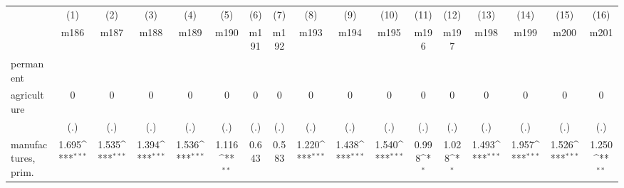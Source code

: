 {
\def\sym#1{\ifmmode^{#1}\else\(^{#1}\)\fi}
\begin{tabular}{l*{16}{c}}
\hline\hline
                    &\multicolumn{1}{c}{(1)}&\multicolumn{1}{c}{(2)}&\multicolumn{1}{c}{(3)}&\multicolumn{1}{c}{(4)}&\multicolumn{1}{c}{(5)}&\multicolumn{1}{c}{(6)}&\multicolumn{1}{c}{(7)}&\multicolumn{1}{c}{(8)}&\multicolumn{1}{c}{(9)}&\multicolumn{1}{c}{(10)}&\multicolumn{1}{c}{(11)}&\multicolumn{1}{c}{(12)}&\multicolumn{1}{c}{(13)}&\multicolumn{1}{c}{(14)}&\multicolumn{1}{c}{(15)}&\multicolumn{1}{c}{(16)}\\
                    &\multicolumn{1}{c}{m186}&\multicolumn{1}{c}{m187}&\multicolumn{1}{c}{m188}&\multicolumn{1}{c}{m189}&\multicolumn{1}{c}{m190}&\multicolumn{1}{c}{m191}&\multicolumn{1}{c}{m192}&\multicolumn{1}{c}{m193}&\multicolumn{1}{c}{m194}&\multicolumn{1}{c}{m195}&\multicolumn{1}{c}{m196}&\multicolumn{1}{c}{m197}&\multicolumn{1}{c}{m198}&\multicolumn{1}{c}{m199}&\multicolumn{1}{c}{m200}&\multicolumn{1}{c}{m201}\\
\hline
permanent           &                     &                     &                     &                     &                     &                     &                     &                     &                     &                     &                     &                     &                     &                     &                     &                     \\
agriculture         &           0         &           0         &           0         &           0         &           0         &           0         &           0         &           0         &           0         &           0         &           0         &           0         &           0         &           0         &           0         &           0         \\
                    &         (.)         &         (.)         &         (.)         &         (.)         &         (.)         &         (.)         &         (.)         &         (.)         &         (.)         &         (.)         &         (.)         &         (.)         &         (.)         &         (.)         &         (.)         &         (.)         \\
[1em]
manufactures, prim. &       1.695\sym{***}&       1.535\sym{***}&       1.394\sym{***}&       1.536\sym{***}&       1.116\sym{**} &       0.643         &       0.583         &       1.220\sym{***}&       1.438\sym{***}&       1.540\sym{***}&       0.998\sym{*}  &       1.028\sym{*}  &       1.493\sym{***}&       1.957\sym{***}&       1.526\sym{***}&       1.250\sym{**} \\

\end{tabular}}
